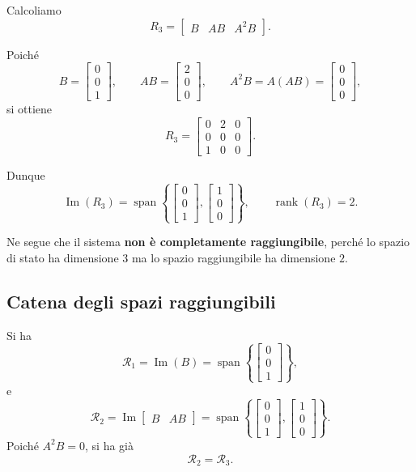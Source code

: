 Calcoliamo
\[
R_3=\begin{bmatrix}B & AB & A^2B\end{bmatrix}.
\]

Poiché
\[
B=
\begin{bmatrix}
0\\0\\1
\end{bmatrix},
\qquad
AB=
\begin{bmatrix}
2\\0\\0
\end{bmatrix},
\qquad
A^2B=A(AB)=
\begin{bmatrix}
0\\0\\0
\end{bmatrix},
\]
si ottiene
\[
R_3=
\begin{bmatrix}
0 & 2 & 0\\
0 & 0 & 0\\
1 & 0 & 0
\end{bmatrix}.
\]

Dunque
\[
\operatorname{Im}(R_3)=\operatorname{span}\!\left\{
\begin{bmatrix}0\\0\\1\end{bmatrix},
\begin{bmatrix}1\\0\\0\end{bmatrix}
\right\},
\qquad
\operatorname{rank}(R_3)=2.
\]

Ne segue che il sistema \textbf{non è completamente raggiungibile}, perché lo spazio di stato ha dimensione \(3\) ma lo spazio raggiungibile ha dimensione \(2\).

\subsection{Catena degli spazi raggiungibili}

Si ha
\[
\mathcal R_1=\operatorname{Im}(B)=
\operatorname{span}\!\left\{
\begin{bmatrix}0\\0\\1\end{bmatrix}
\right\},
\]
e
\[
\mathcal R_2=\operatorname{Im}\!\begin{bmatrix}B & AB\end{bmatrix}
=
\operatorname{span}\!\left\{
\begin{bmatrix}0\\0\\1\end{bmatrix},
\begin{bmatrix}1\\0\\0\end{bmatrix}
\right\}.
\]
Poiché \(A^2B=0\), si ha già
\[
\mathcal R_2=\mathcal R_3.
\]

